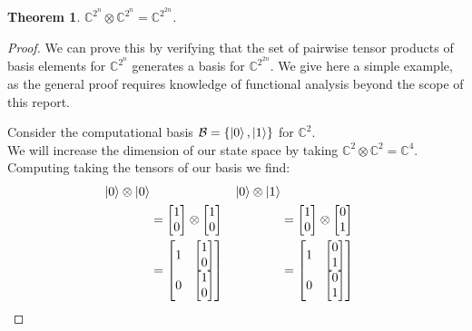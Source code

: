 \documentclass{article}
\renewcommand{\ket}{\Ket}
\theoremstyle{plain}
\newtheorem{theorem}{Theorem}
\theoremstyle{centered}
\renewcommand{\ket}{\Ket}
\newcommand{\camelia}{{\color{red}comment: }}
\newcommand{\tensor}{\otimes}
\newcommand{\bb}[1]{\mathbb{#1}}
\renewcommand{\cal}[1]{\mathcal{#1}}
\begin{document}
        \begin{theorem}
            $\bb{C}^{2^n} \otimes \bb{C}^{2^n} = \bb{C}^{2^{2n}}$.
        \end{theorem}
        \begin{proof}
                We can prove this by verifying that the set of pairwise tensor products of basis elements for $\bb{C}^{2^n}$ generates a basis for $\bb{C}^{2^{2n}}$.
            We give here a simple example, as the general proof requires knowledge of functional analysis beyond the scope of this report.

            Consider the computational basis $\cal{B} = \{\ket{0}, \ket{1}\}$ for $\bb{C}^2$.\\
            We will increase the dimension of our state space by taking $\bb{C}^2 \otimes \bb{C}^2 = \bb{C}^4$.\\
            Computing taking the tensors of our basis we find:
            \begin{align*}
            \ket{0} \tensor \ket{0} & & \ket{0} \tensor \ket{1}\\
            &= \begin{bmatrix} 1 \\ 0 \end{bmatrix} \tensor \begin{bmatrix} 1 \\ 0 \end{bmatrix} & &= \begin{bmatrix} 1 \\ 0 \end{bmatrix} \tensor \begin{bmatrix} 0 \\ 1 \end{bmatrix}\\
            &= \begin{bmatrix} 1 & \begin{bmatrix} 1 \\ 0 \end{bmatrix} \\ 0 & \begin{bmatrix} 1 \\ 0 \end{bmatrix} \end{bmatrix} & &= \begin{bmatrix} 1 & \begin{bmatrix} 0 \\ 1 \end{bmatrix} \\ 0 & \begin{bmatrix} 0 \\ 1 \end{bmatrix} \end{bmatrix}\\

\end{align*}
\end{proof}
\end{document}
